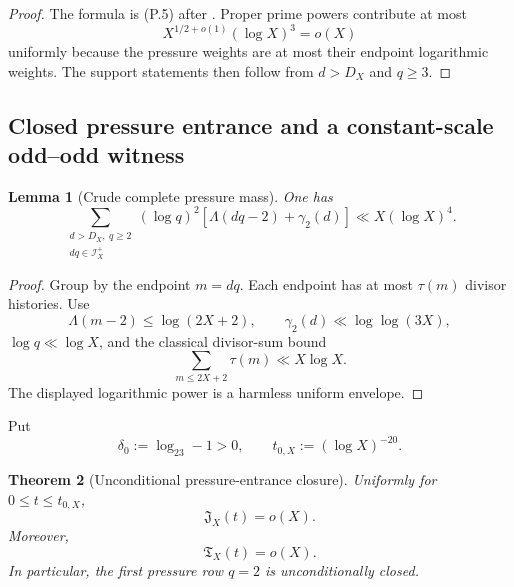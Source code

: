 \documentclass[11pt]{article}
\newtheorem{theorem}{Theorem}[section]
\newtheorem{lemma}[theorem]{Lemma}
\theoremstyle{definition}
\theoremstyle{remark}
\begin{document}
\begin{proof}
The formula is \textup{(P.5)} after
.  Proper prime powers contribute at most
\[
 X^{1/2+o(1)}(\log X)^3=o(X)
\]
uniformly because the pressure weights are at most their endpoint logarithmic
weights.  The support statements then follow from $d>D_X$ and $q\ge3$.
\end{proof}

\subsection{Closed pressure entrance and a constant-scale odd--odd witness}
\label{subsec:affpress-pressure-obstruction}

\begin{lemma}[Crude complete pressure mass]
\label{lem:affpress-pressure-mass}
One has
\begin{equation}
 \label{eq:affpress-pressure-mass}
 \boxed{
 \sum_{\substack{d>D_X,\ q\ge2\\dq\in\mathscr I_X^+}}
 (\log q)^2
 \left[
  \Lambda(dq-2)+\gamma_2(d)
 \right]
 \ll X(\log X)^4.}
 \tag{P.22}
\end{equation}
\end{lemma}

\begin{proof}
Group by the endpoint $m=dq$.  Each endpoint has at most $\tau(m)$ divisor
histories.  Use
\[
 \Lambda(m-2)\le\log(2X+2),
 \qquad
 \gamma_2(d)\ll\log\log(3X),
\]
$\log q\ll\log X$, and the classical divisor-sum bound
\[
 \sum_{m\le2X+2}\tau(m)\ll X\log X.
\]
The displayed logarithmic power is a harmless uniform envelope.
\end{proof}

Put
\[
 \delta_0:=\log_23-1>0,
 \qquad
 t_{0,X}:=(\log X)^{-20}.
\]

\begin{theorem}[Unconditional pressure-entrance closure]
\label{thm:affpress-entrance-closure}
Uniformly for $0\le t\le t_{0,X}$,
\begin{equation}
 \label{eq:affpress-entrance-current}
 \boxed{
 \mathfrak J_X(t)=o(X).}
 \tag{P.23}
\end{equation}
Moreover,
\begin{equation}
 \label{eq:affpress-entrance-pressure}
 \boxed{
 \mathfrak T_X(t)=o(X).}
 \tag{P.24}
\end{equation}
In particular, the first pressure row $q=2$ is unconditionally closed.
\end{theorem}
\end{document}

